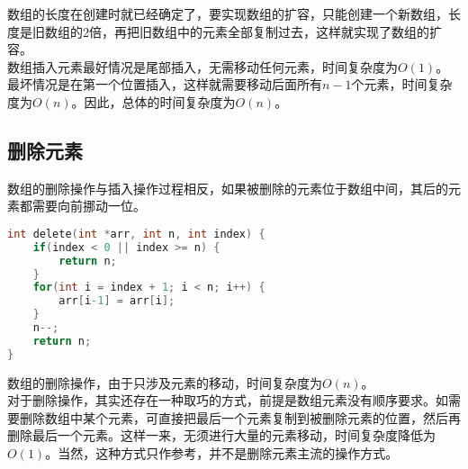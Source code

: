 数组的长度在创建时就已经确定了，要实现数组的扩容，只能创建一个新数组，长度是旧数组的2倍，再把旧数组中的元素全部复制过去，这样就实现了数组的扩容。\\

数组插入元素最好情况是尾部插入，无需移动任何元素，时间复杂度为$ O(1) $。最坏情况是在第一个位置插入，这样就需要移动后面所有$ n - 1 $个元素，时间复杂度为$ O(n) $。因此，总体的时间复杂度为$ O(n) $。\\

\subsection{删除元素}

数组的删除操作与插入操作过程相反，如果被删除的元素位于数组中间，其后的元素都需要向前挪动一位。\\


\begin{lstlisting}[language=C]
int delete(int *arr, int n, int index) {
    if(index < 0 || index >= n) {
        return n;
    }
    for(int i = index + 1; i < n; i++) {
        arr[i-1] = arr[i];
    }
    n--;
    return n;
}
\end{lstlisting}

数组的删除操作，由于只涉及元素的移动，时间复杂度为$ O(n) $。\\

对于删除操作，其实还存在一种取巧的方式，前提是数组元素没有顺序要求。如需要删除数组中某个元素，可直接把最后一个元素复制到被删除元素的位置，然后再删除最后一个元素。这样一来，无须进行大量的元素移动，时间复杂度降低为$ O(1) $。当然，这种方式只作参考，并不是删除元素主流的操作方式。

\newpage